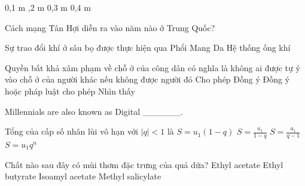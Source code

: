 \begin{ex}
    \choice
    {0,1 m}
    {,2 m}
    {0,3 m}
    {0,4 m}

\end{ex}
\begin{ex}
    Cách mạng Tân Hợi diễn ra vào năm nào ở Trung Quốc?
\end{ex}
\begin{ex}
    Sự trao đổi khí ở sâu bọ được thực hiện qua
    \choice
    {Phổi}
    {Mang}
    {Da}
    {\True Hệ thống ống khí}

\end{ex}
\begin{ex}
    Quyền bất khả xâm phạm về chỗ ở của công dân có nghĩa là không ai được tự ý vào chỗ ở của người khác nếu không được người đó
    \choice
    {Cho phép}
    {Đồng ý}
    {\True Đồng ý hoặc pháp luật cho phép}
    {Nhìn thấy}

\end{ex}
\begin{ex}
    Millennials are also known as Digital ______.
\end{ex}
\begin{ex}
    Tổng của cấp số nhân lùi vô hạn với $|q| < 1$ là
    \choice
    {$S = u_1(1-q)$}
    {\True $S = \frac{u_1}{1-q}$}
    {$S = \frac{u_1}{q-1}$}
    {$S = u_1q^n$}

\end{ex}
\begin{ex}
    Chất nào sau đây có mùi thơm đặc trưng của quả dứa?
    \choice
    {Ethyl acetate}
    {\True Ethyl butyrate}
    {Isoamyl acetate}
    {Methyl salicylate}

\end{ex}
